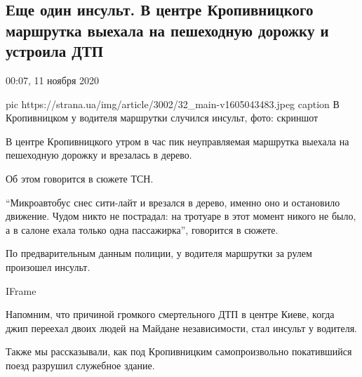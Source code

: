  
 
 

\subsection{Еще один инсульт. В центре Кропивницкого маршрутка выехала на пешеходную дорожку и устроила ДТП}


00:07, 11 ноября 2020

\ifcmt
pic https://strana.ua/img/article/3002/32_main-v1605043483.jpeg
caption В Кропивницком у водителя маршрутки случился инсульт, фото: скриншот
\fi

В центре Кропивницкого утром в час пик неуправляемая маршрутка выехала на
пешеходную дорожку и врезалась в дерево.

Об этом говорится в сюжете ТСН.

\enquote{Микроавтобус снес сити-лайт и врезался в дерево, именно оно и остановило
движение. Чудом никто не пострадал: на тротуаре в этот момент никого не
было, а в салоне ехала только одна пассажирка}, \dshM говорится в сюжете.

По предварительным данным полиции, у водителя маршрутки за рулем произошел
инсульт.

IFrame

Напомним, что причиной громкого смертельного ДТП в центре Киеве, когда
джип переехал двоих людей на Майдане независимости, стал инсульт у
водителя.

Также мы рассказывали, как под Кропивницким самопроизвольно покатившийся
поезд разрушил служебное здание.


